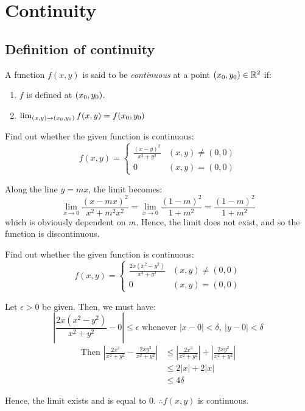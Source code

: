 \section{Continuity}

\subsection{Definition of continuity}
A function $f(x, y)$ is said to be \textit{continuous} at a point $(x_0, y_0) \in \mathbb{R}^2$ if:
\begin{enumerate}
    \item $f$ is defined at $(x_0, y_0)$.
    \item $\lim_{(x, y) \to (x_0, y_0)} f(x, y) = f(x_0, y_0)$
\end{enumerate}

\begin{example} \normalfont Find out whether the given function is continuous:
    \begin{equation*}
        f(x, y) =
        \begin{cases}
            \frac{(x - y)^2}{x^2 + y^2} & (x, y) \neq (0, 0) \\
            0 & (x, y) = (0, 0)
        \end{cases}
    \end{equation*}

    Along the line $y = mx$, the limit becomes:
    $$\lim_{x \to 0} \frac{(x - mx)^2}{x^2 + m^2x^2} = \lim_{x \to 0} \frac{(1-m)^2}{1 + m^2} = \frac{(1-m)^2}{1 + m^2} $$
    which is obviously dependent on $m$. Hence, the limit does not exist, and so the function is discontinuous.
\end{example}

\begin{example} \normalfont Find out whether the given function is continuous:
    \begin{equation*}
        f(x, y) =
        \begin{cases}
            \frac{2x(x^2 - y^2)}{x^2 + y^2} & (x, y) \neq (0, 0) \\
            0 & (x, y) = (0, 0)
        \end{cases}
    \end{equation*}

    Let $\epsilon > 0$ be given. Then, we must have:
    $$\left| \frac{2x(x^2 - y^2)}{x^2 + y^2} - 0 \right| \leq \epsilon \text{ whenever } |x-0| < \delta,\ |y-0| < \delta$$
    \begin{align*}
        \text{Then } \left| \frac{2x^3}{x^2 + y^2} - \frac{2xy^2}{x^2 + y^2} \right|
        &\leq \left| \frac{2x^3}{x^2 + y^2} \right| + \left| \frac{2xy^2}{x^2 + y^2} \right| \\
        &\leq 2|x| + 2|x| \\
        &\leq 4 \delta
    \end{align*}

    Hence, the limit exists and is equal to 0. $\therefore f(x, y)$ is continuous.
\end{example}


